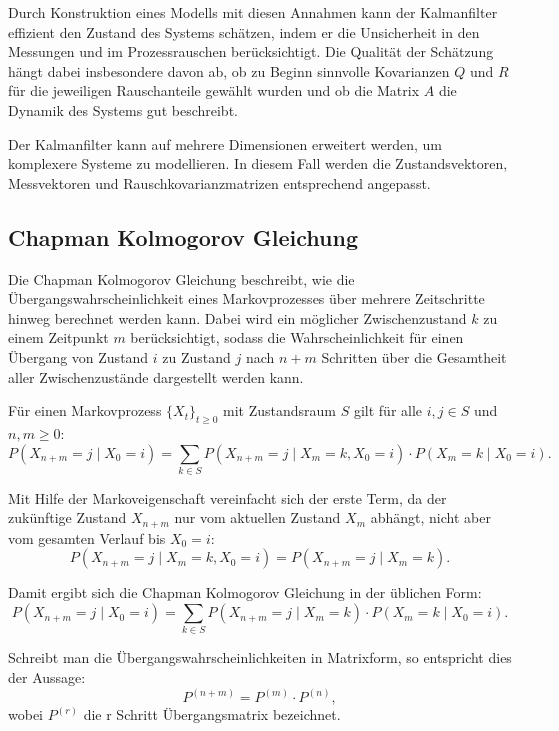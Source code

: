 Durch Konstruktion eines Modells mit diesen Annahmen kann der Kalmanfilter effizient den Zustand des Systems schätzen, indem er die Unsicherheit in den Messungen und im Prozessrauschen berücksichtigt.
Die Qualität der Schätzung hängt dabei insbesondere davon ab, ob zu Beginn sinnvolle Kovarianzen $Q$ und $R$ für die jeweiligen Rauschanteile gewählt wurden und ob die Matrix $A$ die Dynamik des Systems gut beschreibt.

Der Kalmanfilter kann auf mehrere Dimensionen erweitert werden, um komplexere Systeme zu modellieren. 
In diesem Fall werden die Zustandsvektoren, Messvektoren und Rauschkovarianzmatrizen entsprechend angepasst.


\subsection{Chapman Kolmogorov Gleichung}

Die Chapman Kolmogorov Gleichung beschreibt, wie die Übergangswahrscheinlichkeit eines Markovprozesses über mehrere Zeitschritte hinweg berechnet werden kann.
Dabei wird ein möglicher Zwischenzustand $k$ zu einem Zeitpunkt $m$ berücksichtigt, sodass die Wahrscheinlichkeit für einen Übergang von Zustand $i$ zu Zustand $j$ nach $n+m$ Schritten über die Gesamtheit aller Zwischenzustände dargestellt werden kann.

Für einen Markovprozess $\{X_t\}_{t \geq 0}$ mit Zustandsraum $S$ gilt für alle $i, j \in S$ und $n, m \geq 0$:
\begin{equation}
  P(X_{n+m} = j \mid X_0 = i)
  = \sum_{k \in S} P(X_{n+m} = j \mid X_m = k, X_0 = i) \cdot P(X_m = k \mid X_0 = i).
\end{equation}


Mit Hilfe der Markoveigenschaft vereinfacht sich der erste Term, da der zukünftige Zustand $X_{n+m}$ nur vom aktuellen Zustand $X_m$ abhängt, nicht aber vom gesamten Verlauf bis $X_0 = i$:
\begin{equation}
P(X_{n+m} = j \mid X_m = k, X_0 = i) = P(X_{n+m} = j \mid X_m = k).
\end{equation}

Damit ergibt sich die Chapman Kolmogorov Gleichung in der üblichen Form:
\begin{equation}
P(X_{n+m} = j \mid X_0 = i) = \sum_{k \in S} P(X_{n+m} = j \mid X_m = k) \cdot P(X_m = k \mid X_0 = i).
\end{equation}

Schreibt man die Übergangswahrscheinlichkeiten in Matrixform, so entspricht dies der Aussage:
\begin{equation}
P^{(n+m)} = P^{(m)} \cdot P^{(n)},
\end{equation}
wobei $P^{(r)}$ die r Schritt Übergangsmatrix bezeichnet.

